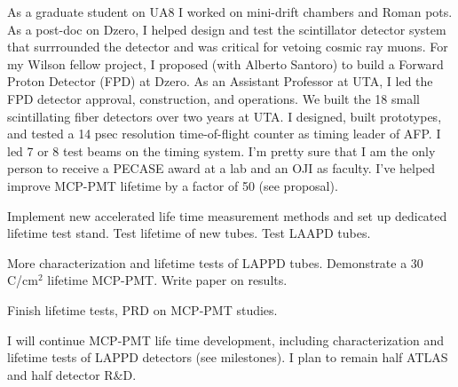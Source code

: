 
\vspace*{0.2in}
\vspace*{0.1in}

 As a graduate student on UA8 I worked on mini-drift chambers and Roman pots.  As a post-doc on Dzero, I helped design and test the scintillator detector system that surrrounded the detector and was critical for vetoing cosmic ray muons.  For my Wilson fellow project,  I proposed (with Alberto Santoro) to build a Forward Proton Detector (FPD) at Dzero. As an Assistant Professor at UTA, I led  the FPD detector approval, construction, and operations. We built the 18 small scintillating fiber detectors over two years at UTA.  I designed, built prototypes, and tested a 14 psec resolution time-of-flight counter as timing leader of AFP.  I led 7 or 8 test beams on the timing system. I'm pretty sure that I am the only person to receive a PECASE award at a lab and an OJI as faculty. I've helped improve MCP-PMT lifetime by a factor of 50 (see proposal). 

\vspace*{0.1in}
\begin{description}
\item[2017] Implement new accelerated life time measurement methods and set up dedicated lifetime test stand.  Test lifetime of new tubes. Test LAAPD tubes.
\item[2018] More characterization and lifetime tests of LAPPD tubes. Demonstrate a 30 C/cm$^2$ lifetime MCP-PMT. Write paper on results.
\item[2019] Finish lifetime tests, PRD on MCP-PMT studies.
\end{description}
\vspace*{0.1in}
 I will continue MCP-PMT life time development, including characterization and lifetime tests of LAPPD detectors (see milestones).   I plan to remain half ATLAS and half detector R\&D. 
